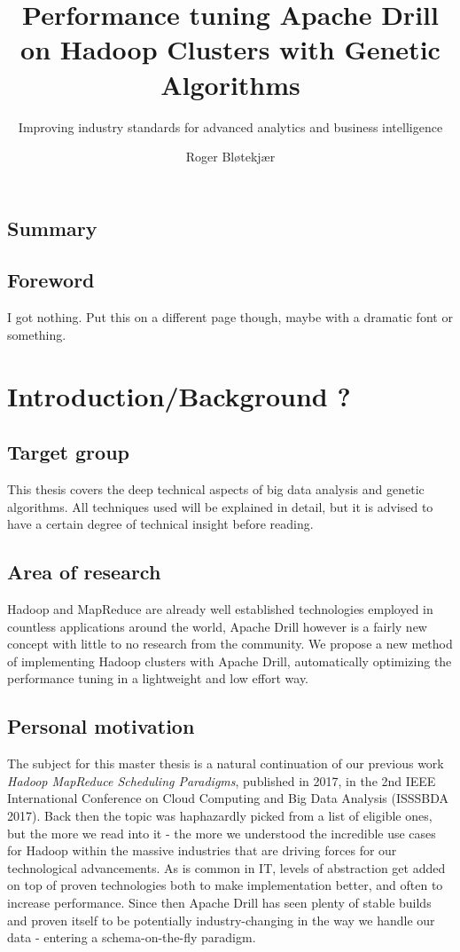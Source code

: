 \documentclass[a4paper,english]{report}
\title{Performance tuning Apache Drill on Hadoop Clusters with Genetic Algorithms}
\subtitle{Improving industry standards for advanced analytics and business intelligence}
\author{Roger Bløtekjær}
\begin{document}
	\duoforside[dept={Institutt for informatikk},
	program={Informatikk: språkteknologi},
	short]
	\section{Summary}
	\section{Foreword}
	I got nothing. Put this on a different page though, maybe with a dramatic font or something.
	\tableofcontents
	\chapter{Introduction/Background ?}
		\section{Target group}
		This thesis covers the deep technical aspects of big data analysis and genetic algorithms. All techniques used will be explained in detail, but it is advised to have a certain degree of technical insight before reading.
		\section{Area of research}
		Hadoop and MapReduce are already well established technologies employed in countless applications around the world, Apache Drill however is a fairly new concept with little to no research from the community. We propose a new method of implementing Hadoop clusters with Apache Drill, automatically optimizing the performance tuning in a lightweight and low effort way.
		\section{Personal motivation}
		The subject for this master thesis is a natural continuation of our previous work \emph{Hadoop MapReduce Scheduling Paradigms}, published in 2017, in the 2nd IEEE International Conference on Cloud Computing and Big Data Analysis (ISSSBDA 2017). Back then the topic was haphazardly picked from a list of eligible ones, but the more we read into it - the more we understood the incredible use cases for Hadoop within the massive industries that are driving forces for our technological advancements. As is common in IT, levels of abstraction get added on top of proven technologies both to make implementation better, and often to increase performance. Since then Apache Drill has seen plenty of stable builds and proven itself to be potentially industry-changing in the way we handle our data - entering a schema-on-the-fly paradigm.
\end{document}
